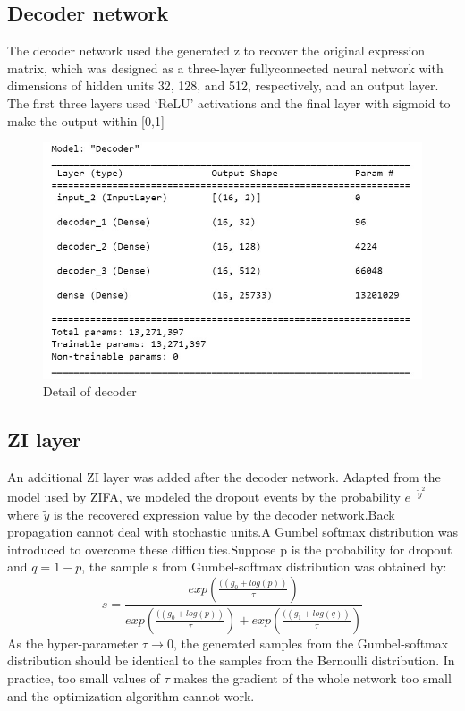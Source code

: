 \documentclass[12 pts]{article}
\begin{document}
\subsection*{Decoder network}
The decoder network used the generated z to recover the original expression matrix, which was designed as a three-layer fullyconnected neural network with dimensions of hidden units 32, 128, and 512, respectively, and an output layer. The first three layers used ‘ReLU’ activations and the final layer with sigmoid to make the output within [0,1]

\begin{figure}[H]
\centering
\includegraphics[scale=0.85]{decoder}
\caption{Detail of decoder}
\label{fig: decoder}
\end{figure}

\subsection*{ZI layer}
An additional ZI layer was added after the decoder network. Adapted from the model used by ZIFA, we modeled the dropout events by the probability $e^{-\tilde{y}^2}$ where $\tilde{y}$ is the recovered expression value by the decoder network.Back propagation cannot deal with stochastic units.A Gumbel softmax distribution was introduced to overcome these difficulties.Suppose p is the probability for dropout and $q = 1-p$, the sample s from Gumbel-softmax distribution was obtained by:
\begin{equation}
s = \frac{exp(\frac{((g_0 + log(p))}{\tau})}{exp(\frac{((g_0 + log(p))}{\tau})+exp(\frac{((g_1 + log(q))}{\tau})}
\label{Gumbel-softmax distribution VASC}
\end{equation}
As the hyper-parameter $\tau \rightarrow 0$, the generated samples from the Gumbel-softmax distribution should be identical to the samples from the Bernoulli distribution. In practice, too small values of $\tau$ makes the gradient of the whole network too small and the optimization algorithm cannot work.
\end{document}
